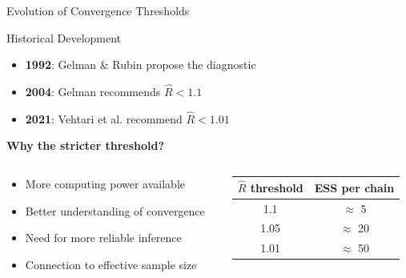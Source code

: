 \begin{frame}{Evolution of Convergence Thresholds}
	\begin{block}{Historical Development}
		\begin{itemize}
			\item \textbf{1992}: Gelman \& Rubin propose the diagnostic
			\item \textbf{2004}: Gelman recommends $\hat{R} < 1.1$
			\item \textbf{2021}: Vehtari et al. recommend $\hat{R} < 1.01$
		\end{itemize}
	\end{block}

	\vspace{0.5cm}
	\textbf{Why the stricter threshold?}

	\begin{columns}
		\begin{column}{0.5\textwidth}
			\begin{itemize}
				\item More computing power available
				\item Better understanding of convergence
				\item Need for more reliable inference
				\item Connection to effective sample size
			\end{itemize}
		\end{column}
		\begin{column}{0.5\textwidth}
			\begin{center}
				\begin{tabular}{|c|c|}
					\hline
					$\hat{R}$ threshold & ESS per chain \\
					\hline
					1.1                 & $\approx$ 5   \\
					1.05                & $\approx$ 20  \\
					1.01                & $\approx$ 50  \\
					\hline
				\end{tabular}
			\end{center}
		\end{column}
	\end{columns}
\end{frame}

